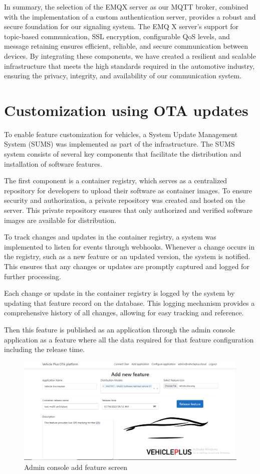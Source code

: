 \documentclass[
12pt,
oneside, 
onehalfspacing, 
nolistspacing, 
parskip, 
chapterinoneline, 
]{AASTCOMPUTER}
\begin{document}
In summary, the selection of the EMQX server as our MQTT broker, combined with the implementation of a custom authentication server, provides a robust and secure foundation for our signaling system. The EMQ X server's support for topic-based communication, SSL encryption, configurable QoS levels, and message retaining ensures efficient, reliable, and secure communication between devices. By integrating these components, we have created a resilient and scalable infrastructure that meets the high standards required in the automotive industry, ensuring the privacy, integrity, and availability of our communication system.
\section{Customization using OTA updates}
To enable feature customization for vehicles, a System Update Management System (SUMS) was implemented as part of the infrastructure. The SUMS system consists of several key components that facilitate the distribution and installation of software features.

The first component is a container registry, which serves as a centralized repository for developers to upload their software as container images. To ensure security and authorization, a private repository was created and hosted on the server. This private repository ensures that only authorized and verified software images are available for distribution.

To track changes and updates in the container registry, a system was implemented to listen for events through webhooks. Whenever a change occurs in the registry, such as a new feature or an updated version, the system is notified. This ensures that any changes or updates are promptly captured and logged for further processing.

Each change or update in the container registry is logged by the system by updating that feature record on the database. This logging mechanism provides a comprehensive history of all changes, allowing for easy tracking and reference.


Then this feature is published as an application through the admin console application as a feature where all the data required for that feature configuration including the release time.

 \begin{figure}[!ht]
	\centering
	\includegraphics[scale=0.4]{Figures/FrontEnd/AdminConsole/add.PNG}
  	\caption{Admin console add feature screen}
  	\label{fig:Admin console add feature screen}
\end{figure}
\end{document}
